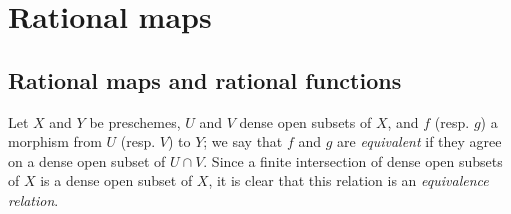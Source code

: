 \section{Rational maps}
\label{section:I.7}

\subsection{Rational maps and rational functions}
\label{subsection:I.7.1}

\begin{env}[7.1.1]
\label{I.7.1.1}
Let $X$ and $Y$ be preschemes, $U$ and $V$ dense open subsets of $X$, and $f$ (resp. $g$) a morphism from $U$ (resp. $V$) to $Y$; we say that $f$ and $g$ are \emph{equivalent} if they agree on a dense open subset of $U\cap V$.
Since a finite intersection of dense open subsets of $X$ is a dense open subset of $X$, it is clear that this relation is an \emph{equivalence relation}.
\end{env}

